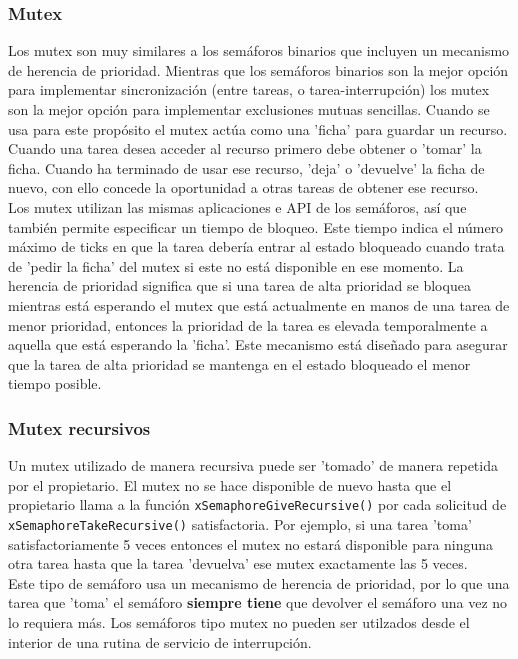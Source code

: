 \subsubsection{Mutex}

Los mutex son muy similares a los semáforos binarios que incluyen un mecanismo de herencia de prioridad. Mientras que los semáforos binarios son la mejor opción para implementar sincronización (entre tareas, o tarea-interrupción) los mutex son la mejor opción para implementar exclusiones mutuas sencillas. Cuando se usa para este propósito el mutex actúa como una 'ficha' para guardar un recurso. Cuando una tarea desea acceder al recurso primero debe obtener o 'tomar' la ficha. Cuando ha terminado de usar ese recurso, 'deja' o 'devuelve' la ficha de nuevo, con ello concede la oportunidad a otras tareas de obtener ese recurso.\\

Los mutex utilizan las mismas aplicaciones e API de los semáforos, así que también permite especificar un tiempo de bloqueo. Este tiempo indica el número máximo de ticks en que la tarea debería entrar al estado bloqueado cuando trata de 'pedir la ficha' del mutex si este no está disponible en ese momento. La herencia de prioridad significa que si una tarea de alta prioridad se bloquea mientras está esperando el mutex que está actualmente en manos de una tarea de menor prioridad, entonces la prioridad de la tarea es elevada temporalmente a aquella que está esperando la 'ficha'. Este mecanismo está diseñado para asegurar que la tarea de alta prioridad se mantenga en el estado bloqueado el menor tiempo posible.\\

\subsubsection{Mutex recursivos}

Un mutex utilizado de manera recursiva puede ser 'tomado' de manera repetida por el propietario. El mutex no se hace disponible de nuevo hasta que el propietario llama a la función \texttt{xSemaphoreGiveRecursive()} por cada solicitud de \texttt{xSemaphoreTakeRecursive()} satisfactoria. Por ejemplo, si una tarea 'toma' satisfactoriamente 5 veces entonces el mutex no estará disponible para ninguna otra tarea hasta que la tarea 'devuelva' ese mutex exactamente las 5 veces.\\

Este tipo de semáforo usa un mecanismo de herencia de prioridad, por lo que una tarea que 'toma' el semáforo \textbf{siempre tiene} que devolver el semáforo una vez no lo requiera más. Los semáforos tipo mutex no pueden ser utilzados desde el interior de una rutina de servicio de interrupción.\\

